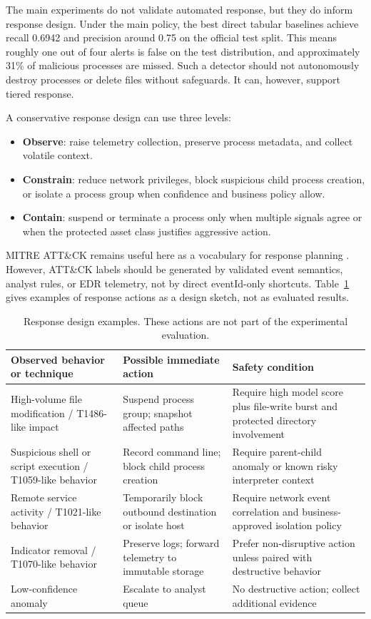 \documentclass[10pt,journal,compsoc]{IEEEtran}
\begin{document}
The main experiments do not validate automated response, but they do inform response design. Under the main policy, the best direct tabular baselines achieve recall 0.6942 and precision around 0.75 on the official test split. This means roughly one out of four alerts is false on the test distribution, and approximately 31\% of malicious processes are missed. Such a detector should not autonomously destroy processes or delete files without safeguards. It can, however, support tiered response.

A conservative response design can use three levels:
\begin{itemize}
    \item \textbf{Observe}: raise telemetry collection, preserve process metadata, and collect volatile context.
    \item \textbf{Constrain}: reduce network privileges, block suspicious child process creation, or isolate a process group when confidence and business policy allow.
    \item \textbf{Contain}: suspend or terminate a process only when multiple signals agree or when the protected asset class justifies aggressive action.
\end{itemize}

MITRE ATT\&CK remains useful here as a vocabulary for response planning \cite{mitre2023}. However, ATT\&CK labels should be generated by validated event semantics, analyst rules, or EDR telemetry, not by direct eventId-only shortcuts. Table~\ref{tab:response} gives examples of response actions as a design sketch, not as evaluated results.

\begin{table}[t]
\centering
\caption{Response design examples. These actions are not part of the experimental evaluation.}
\label{tab:response}
\begin{tabular}{p{3.8cm}p{5.4cm}p{6.2cm}}
\toprule
\textbf{Observed behavior or technique} & \textbf{Possible immediate action} & \textbf{Safety condition} \\
\midrule
High-volume file modification / T1486-like impact & Suspend process group; snapshot affected paths & Require high model score plus file-write burst and protected directory involvement \\
Suspicious shell or script execution / T1059-like behavior & Record command line; block child process creation & Require parent-child anomaly or known risky interpreter context \\
Remote service activity / T1021-like behavior & Temporarily block outbound destination or isolate host & Require network event correlation and business-approved isolation policy \\
Indicator removal / T1070-like behavior & Preserve logs; forward telemetry to immutable storage & Prefer non-disruptive action unless paired with destructive behavior \\
Low-confidence anomaly & Escalate to analyst queue & No destructive action; collect additional evidence \\
\bottomrule
\end{tabular}
\end{table}
\end{document}
